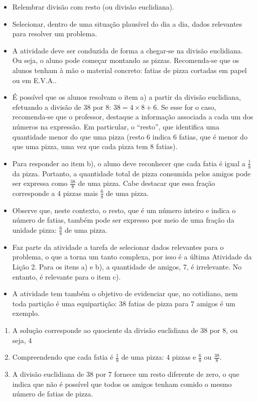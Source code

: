 \begin{atividade}\label{chap2-ativ20}
\objetivos
\begin{itemize} %
    \item       Relembrar divisão com resto (ou divisão euclidiana).
    \item       Selecionar, dentro de uma situação plausível do dia a dia, dados relevantes para resolver um problema.
\end{itemize} %

\discussoes
\begin{itemize} %
    \item       A atividade deve ser conduzida de forma a chegar-se na divisão euclidiana. Ou seja, o aluno pode começar montando as pizzas. Recomenda-se que os alunos tenham à mão o material concreto: fatias de pizza cortadas em papel ou em E.V.A..
    \item       É possível que os alunos resolvam o item a) a partir da divisão euclidiana, efetuando a divisão de 38 por 8: $38 = 4 \times 8 + 6$. Se esse for o caso, recomenda-se que o professor, destaque a informação associada a cada um dos números na expressão. Em particular, o       ``resto'', que identifica uma quantidade menor do que uma pizza (resto 6 indica 6 fatias, que é menor do que uma pizza, uma vez que cada pizza tem 8 fatias).
    \item       Para responder ao item b), o aluno deve reconhecer que cada fatia é igual a       $\frac{1}{8}$ da pizza. Portanto, a quantidade total de pizza consumida pelos amigos pode ser expressa como       $\frac{38}{8}$ de uma pizza. Cabe destacar que essa fração corresponde a 4 pizzas mais $\frac{6}{8}$ de uma pizza.
    \item        Observe que, neste contexto, o resto, que é um número inteiro e indica o número de fatias, também pode ser expresso por meio de uma fração da unidade pizza:       $\frac{6}{8}$ de uma pizza.
    \item       Faz parte da atividade a tarefa de selecionar dados relevantes para o problema, o que a torna um tanto complexa, por isso é a última Atividade da Lição 2. Para os itens a) e b), a quantidade de amigos, 7, é irrelevante. No entanto, é relevante para o item c).
    \item       A atividade tem também o objetivo de evidenciar que, no cotidiano, nem toda partição é uma equipartição: 38 fatias de pizza para 7 amigos é um exemplo.
\end{itemize} %

\solucao
\begin{enumerate} %
    \item       A solução corresponde ao quociente da divisão euclidiana de 38 por 8, ou seja, 4
    \item       Compreendendo que cada fatia é       $\frac{1}{8}$ de uma pizza: 4 pizzas e       $\frac{6}{8}$ ou       $\frac{38}{8}$.
    \item       A divisão euclidiana de 38 por 7 fornece um resto diferente de zero, o que indica que não é possível que todos os amigos tenham comido o mesmo número de fatias de pizza.
\end{enumerate} %
\end{atividade}